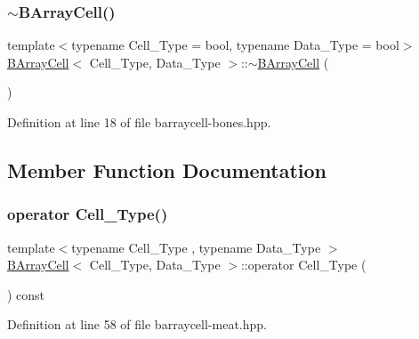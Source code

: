 \subsubsection{\texorpdfstring{$\sim$\+B\+Array\+Cell()}{~BArrayCell()}}
{\footnotesize\ttfamily template$<$typename Cell\+\_\+\+Type = bool, typename Data\+\_\+\+Type = bool$>$ \\
\hyperlink{class_b_array_cell}{B\+Array\+Cell}$<$ Cell\+\_\+\+Type, Data\+\_\+\+Type $>$\+::$\sim$\hyperlink{class_b_array_cell}{B\+Array\+Cell} (\begin{DoxyParamCaption}{ }\end{DoxyParamCaption})\hspace{0.3cm}{\ttfamily [inline]}}



Definition at line 18 of file barraycell-\/bones.\+hpp.



\subsection{Member Function Documentation}
\mbox{\label{class_b_array_cell_a698f664c230f91bf03a97966378e339b}} 
\subsubsection{\texorpdfstring{operator Cell\+\_\+\+Type()}{operator Cell\_Type()}}
{\footnotesize\ttfamily template$<$typename Cell\+\_\+\+Type , typename Data\+\_\+\+Type $>$ \\
\hyperlink{class_b_array_cell}{B\+Array\+Cell}$<$ Cell\+\_\+\+Type, Data\+\_\+\+Type $>$\+::operator Cell\+\_\+\+Type (\begin{DoxyParamCaption}{ }\end{DoxyParamCaption}) const\hspace{0.3cm}{\ttfamily [inline]}}



Definition at line 58 of file barraycell-\/meat.\+hpp.

\mbox{\label{class_b_array_cell_abc193e5d3dd8d04e5d4bb8d808fde35d}} 
